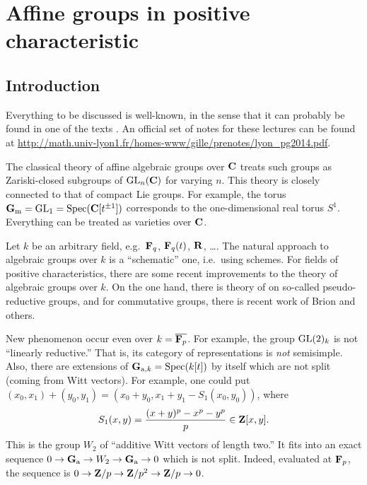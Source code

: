 
\section{Affine groups in positive characteristic}





\subsection{Introduction}

Everything to be discussed is well-known, in the sense that it can probably be 
found in one of the texts \cite{dg80,milneAGS}. An official set of notes for 
these lectures can be found at \url{http://math.univ-lyon1.fr/homes-www/gille/prenotes/lyon_pg2014.pdf}. 

The classical theory of affine algebraic groups over $\mathbf{C}$ treats such groups 
as Zariski-closed subgroups of $\operatorname{GL}_n(\mathbf{C})$ for varying $n$. This theory 
is closely connected to that of compact Lie groups. For example, the torus 
$\mathbf{G}_{\mathrm{m}}=\operatorname{GL}_1=\operatorname{Spec}(\mathbf{C}[t^{\pm 1}])$ corresponds to the 
one-dimensional real torus $S^1$. Everything can be treated as varieties over 
$\mathbf{C}$. 

Let $k$ be an arbitrary field, e.g.\ $\mathbf{F}_q$, $\mathbf{F}_q(t)$, $\mathbf{R}$, \ldots. The 
natural approach to algebraic groups over $k$ is a ``schematic'' one, i.e.\ 
using schemes. For fields of positive characteristics, there are some recent 
improvements to the theory of algebraic groups over $k$. On the one hand, there 
is theory of \cite{cgp10} on so-called pseudo-reductive groups, and 
for commutative groups, there is recent work of Brion and others. 

New phenomenon occur even over $k=\overline{\mathbf{F}_p}$. For example, the group 
$\operatorname{GL}(2)_k$ is not ``linearly reductive.'' 
That is, its 
category of representations is \emph{not} semisimple. Also, there are 
extensions of $\mathbf{G}_{\mathrm{a},k}=\operatorname{Spec}(k[t])$ by itself which are not 
split (coming from Witt vectors). For example, one could put 
$(x_0,x_1)+(y_0,y_1) = (x_0+y_0, x_1+y_1-S_1(x_0,y_0))$, where 
\[
  S_1(x,y) = \frac{(x+y)^p - x^p-y^p}{p} \in \mathbf{Z}[x,y] .
\]
This is the group $W_2$ of ``additive Witt vectors of length two.'' It fits 
into an exact sequence $0 \to \mathbf{G}_{\mathrm{a}} \to W_2 \to \mathbf{G}_{\mathrm{a}} \to 0$ 
which is not split. Indeed, evaluated at $\mathbf{F}_p$, the sequence is 
$0 \to \mathbf{Z}/p \to \mathbf{Z}/p^2 \to \mathbf{Z}/p \to 0$. 

